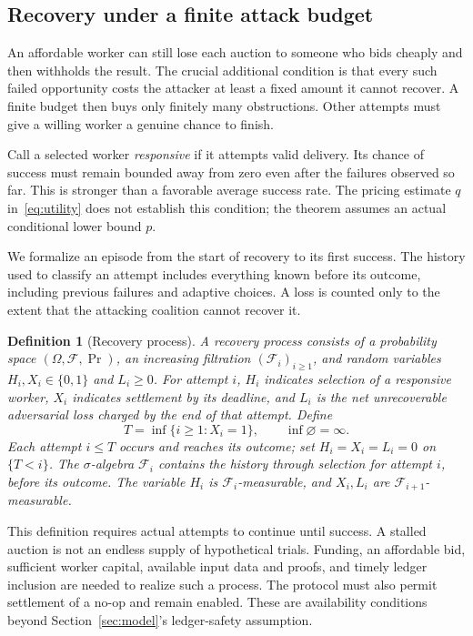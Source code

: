 \documentclass[10pt,letterpaper]{article}
\newtheorem{definition}{Definition}
\begin{document}
\subsection{Recovery under a finite attack budget}
An affordable worker can still lose each auction to someone who bids cheaply and then withholds the result. The crucial additional condition is that every such failed opportunity costs the attacker at least a fixed amount it cannot recover. A finite budget then buys only finitely many obstructions. Other attempts must give a willing worker a genuine chance to finish.

Call a selected worker \emph{responsive} if it attempts valid delivery. Its chance of success must remain bounded away from zero even after the failures observed so far. This is stronger than a favorable average success rate. The pricing estimate $q$ in~\eqref{eq:utility} does not establish this condition; the theorem assumes an actual conditional lower bound $p$.

We formalize an episode from the start of recovery to its first success. The history used to classify an attempt includes everything known before its outcome, including previous failures and adaptive choices. A loss is counted only to the extent that the attacking coalition cannot recover it.

\begin{definition}[Recovery process]
\label{def:recovery}
A recovery process consists of a probability space $(\Omega,\mathcal F,\Pr)$, an increasing filtration $(\mathcal F_i)_{i\geq1}$, and random variables $H_i,X_i\in\{0,1\}$ and $L_i\geq0$. For attempt $i$, $H_i$ indicates selection of a responsive worker, $X_i$ indicates settlement by its deadline, and $L_i$ is the net unrecoverable adversarial loss charged by the end of that attempt. Define
\[
 T=\inf\{i\geq1:X_i=1\},\qquad \inf\varnothing=\infty.
\]
Each attempt $i\leq T$ occurs and reaches its outcome; set $H_i=X_i=L_i=0$ on $\{T<i\}$. The $\sigma$-algebra $\mathcal F_i$ contains the history through selection for attempt $i$, before its outcome. The variable $H_i$ is $\mathcal F_i$-measurable, and $X_i,L_i$ are $\mathcal F_{i+1}$-measurable.
\end{definition}

This definition requires actual attempts to continue until success. A stalled auction is not an endless supply of hypothetical trials. Funding, an affordable bid, sufficient worker capital, available input data and proofs, and timely ledger inclusion are needed to realize such a process. The protocol must also permit settlement of a no-op and remain enabled. These are availability conditions beyond Section~\ref{sec:model}'s ledger-safety assumption.
\end{document}
